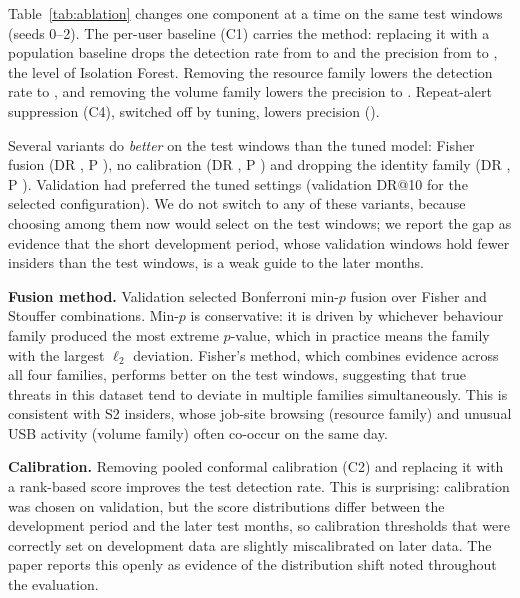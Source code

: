 Table~\ref{tab:ablation} changes one component at a time on the same test windows (seeds 0--2).
The per-user baseline (C1) carries the method: replacing it with a population baseline drops the
detection rate from \AblFullDR{} to \AblNoCOneDR{} and the precision from \AblFullP{} to
\AblNoCOneP{}, the level of Isolation Forest. Removing the resource family lowers the detection rate
to \AblNoResourceDR{}, and removing the volume family lowers the precision to \AblNoVolumeP{}.
Repeat-alert suppression (C4), switched off by tuning, lowers precision (\AblCFourP).

Several variants do \emph{better} on the test windows than the tuned model: Fisher fusion
(DR \AblFisherDR, P \AblFisherP), no calibration (DR \AblNoCTwoDR, P \AblNoCTwoP) and dropping the
identity family (DR \AblNoIdentityDR, P \AblNoIdentityP). Validation had preferred the tuned
settings (validation DR@10 \ValDROurs{} for the selected configuration). We do not switch to any of
these variants, because choosing among them now would select on the test windows; we report the gap
as evidence that the short development period, whose validation windows hold fewer insiders than
the test windows, is a weak guide to the later months.

\textbf{Fusion method.} Validation selected Bonferroni min-$p$ fusion over Fisher and Stouffer
combinations. Min-$p$ is conservative: it is driven by whichever behaviour family produced the
most extreme $p$-value, which in practice means the family with the largest $\ell_2$ deviation.
Fisher's method, which combines evidence across all four families, performs better on the test
windows, suggesting that true threats in this dataset tend to deviate in multiple families
simultaneously. This is consistent with S2 insiders, whose job-site browsing (resource family)
and unusual USB activity (volume family) often co-occur on the same day.

\textbf{Calibration.} Removing pooled conformal calibration (C2) and replacing it with a
rank-based score improves the test detection rate. This is surprising: calibration was chosen on
validation, but the score distributions differ between the development period and the later test
months, so calibration thresholds that were correctly set on development data are slightly
miscalibrated on later data. The paper reports this openly as evidence of the distribution shift
noted throughout the evaluation.

\begin{table}[t]
\centering
\caption{Ablation at 10 alerts/day on the test windows (DR with 95\% CI over insiders; P@10).}
\label{tab:ablation}
\end{table}
